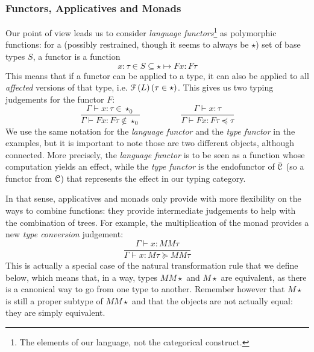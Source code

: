 \subsubsection{Functors, Applicatives and Monads}
\label{subsubsec:functors}
Our point of view leads us to consider \emph{language functors}\footnote{The
	elements of our language, not the categorical construct.} as polymorphic
functions: for a (possibly restrained, though it seems to always be $\star$)
set of base types $S$, a functor is a function
\begin{equation*}
	x: \tau\in S\subseteq \star \mapsto F x: F\tau
\end{equation*}
This means that if a functor can be applied to a type, it can also be applied
to all \emph{affected} versions of that type, i.e.
$\mathcal{F}\left( L \right)(\tau\in \star)$.
This gives us two typing judgements for the functor $F$:
\begin{equation*}
	\frac{\Gamma\vdash x: \tau \in \star_{0}}{\Gamma\vdash F x: F\tau \notin
		\star_{0}} \hspace{2cm} \frac{\Gamma\vdash x:
		\tau}{\Gamma\vdash Fx : F\tau\preceq \tau}
\end{equation*}
We use the same notation for the \emph{language functor} and the
\emph{type functor} in the examples, but it is important to note those are two
different objects, although connected.
More precisely, the \emph{language functor} is to be seen as a function whose
computation yields an effect, while the \emph{type functor} is the endofunctor
of $\bar{\mathcal{C}}$ (so a functor from $\mathcal{C}$) that represents the effect in our
typing category.

\smallskip

In that sense, applicatives and monads only provide with more flexibility on
the ways to combine functions:
they provide intermediate judgements to help with the combination of trees.
For example, the multiplication of the monad provides a new
\emph{type conversion} judgement:
\begin{equation*}
	\frac{\Gamma\vdash x: MM\tau}{\Gamma\vdash x: M\tau \succeq MM\tau}
\end{equation*}
This is actually a special case of the natural transformation rule that we
define below, which means that, in a way, types $MM\star$ and $M\star$ are
equivalent, as there is a canonical way to go from one type to another.
Remember however that $M\star$ is still a proper subtype of $MM\star$ and that
the objects are not actually equal: they are simply equivalent.

